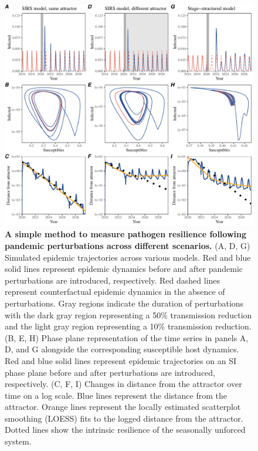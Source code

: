 \documentclass[12pt]{article}
\begin{document}
\begin{figure}[!th]
\includegraphics[width=\textwidth]{../figure2/figure2_simple.pdf}
\caption{
\textbf{A simple method to measure pathogen resilience following pandemic perturbations across different scenarios.}
(A, D, G) Simulated epidemic trajectories across various models. 
Red and blue solid lines represent epidemic dynamics before and after pandemic perturbations are introduced, respectively.
Red dashed lines represent counterfactual epidemic dynamics in the absence of perturbations.
Gray regions indicate the duration of perturbations with the dark gray region representing a 50\% transmission reduction and the light gray region representing a 10\% transmission reduction.
(B, E, H) Phase plane representation of the time series in panels A, D, and G alongside the corresponding susceptible host dynamics.
Red and blue solid lines represent epidemic trajectories on an SI phase plane before and after perturbations are introduced, respectively.
(C, F, I) Changes in distance from the attractor over time on a log scale.
Blue lines represent the distance from the attractor.
Orange lines represent the locally estimated scatterplot smoothing (LOESS) fits to the logged distance from the attractor.
Dotted lines show the intrinsic resilience of the seasonally unforced system.
}
\end{figure}
\end{document}
